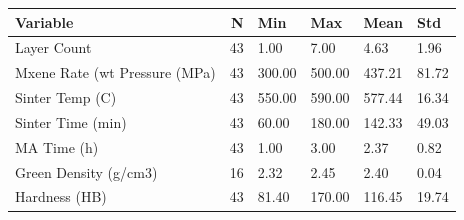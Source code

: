 \begin{tabular}{lrllll}
\toprule
Variable & N & Min & Max & Mean & Std \\
\midrule
Layer Count & 43 & 1.00 & 7.00 & 4.63 & 1.96 \\
Mxene Rate (wt%
Pressure (MPa) & 43 & 300.00 & 500.00 & 437.21 & 81.72 \\
Sinter Temp (C) & 43 & 550.00 & 590.00 & 577.44 & 16.34 \\
Sinter Time (min) & 43 & 60.00 & 180.00 & 142.33 & 49.03 \\
MA Time (h) & 43 & 1.00 & 3.00 & 2.37 & 0.82 \\
Green Density (g/cm3) & 16 & 2.32 & 2.45 & 2.40 & 0.04 \\
Hardness (HB) & 43 & 81.40 & 170.00 & 116.45 & 19.74 \\
\bottomrule
\end{tabular}
